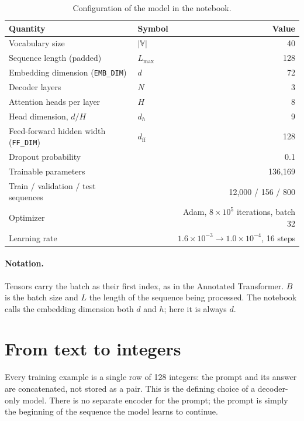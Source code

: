 \documentclass[11pt]{article}
\newcommand{\code}[1]{\texttt{#1}}
\newcommand{\V}{\mathbb{V}}
\begin{document}
\begin{table}[h]
\centering\small
\caption{Configuration of the model in the notebook.}
\label{tab:config}
\begin{tabular}{@{}llr@{}}
\toprule
Quantity & Symbol & Value \\
\midrule
Vocabulary size & $|\V|$ & 40 \\
Sequence length (padded) & $L_{\max}$ & 128 \\
Embedding dimension (\code{EMB\_DIM}) & $d$ & 72 \\
Decoder layers & $N$ & 3 \\
Attention heads per layer & $H$ & 8 \\
Head dimension, $d/H$ & $d_h$ & 9 \\
Feed-forward hidden width (\code{FF\_DIM}) & $d_{\text{ff}}$ & 128 \\
Dropout probability & & 0.1 \\
Trainable parameters & & 136{,}169 \\
Train / validation / test sequences & & 12{,}000 / 156 / 800 \\
Optimizer & & Adam, $8\times10^5$ iterations, batch 32 \\
Learning rate & & $1.6\times10^{-3}\to1.0\times10^{-4}$, 16 steps \\
\bottomrule
\end{tabular}
\end{table}

\paragraph{Notation.} Tensors carry the batch as their first index, as in the
Annotated Transformer. $B$ is the batch size and $L$ the length of the sequence being
processed. The notebook calls the embedding dimension both $d$ and $h$; here it is
always $d$.

\section{From text to integers}

Every training example is a single row of 128 integers: the prompt and its answer are
concatenated, not stored as a pair. This is the defining choice of a decoder-only
model. There is no separate encoder for the prompt; the prompt is simply the
beginning of the sequence the model learns to continue.
\end{document}
